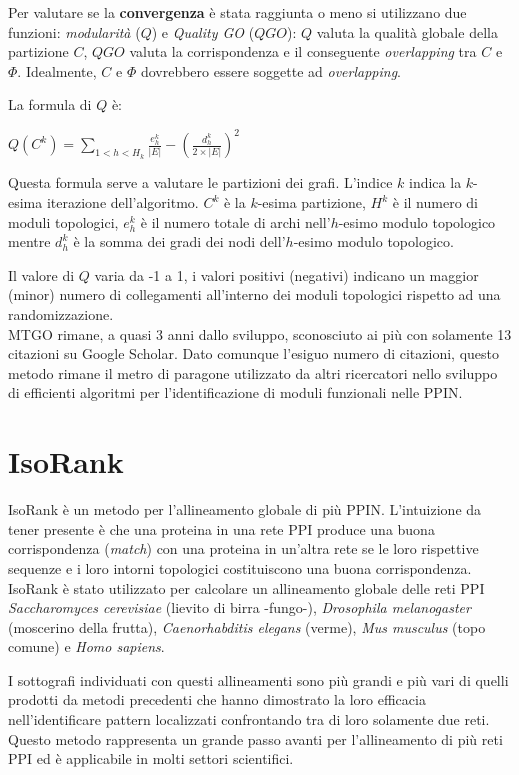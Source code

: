 \documentclass[11pt]{article}
\begin{document}
Per valutare se la \textbf{convergenza} è stata raggiunta o meno si utilizzano due funzioni: \textit{modularità} ($Q$) e \textit{Quality GO} ($QGO$): $Q$ valuta la qualità globale della partizione $C$, $QGO$ valuta la corrispondenza e il conseguente \textit{overlapping} tra $C$ e $\Phi$. Idealmente, $C$ e $\Phi$ dovrebbero essere soggette ad \textit{overlapping}.

La formula di $Q$ è:

\begin{center}
$Q(C^k) = \displaystyle{\sum_{1<h<H_k}\frac{e^k_h}{|E|} - \left(\frac{d^k_h}{2 \times |E|}\right)^2}$
\end{center}

Questa formula serve a valutare le partizioni dei grafi. L'indice $k$ indica la $k$-esima iterazione dell'algoritmo. $C^k$ è la $k$-esima partizione, $H^k$ è il numero di moduli topologici, $e^k_h$ è il numero totale di archi nell'$h$-esimo modulo topologico mentre $d^k_h$ è la somma dei gradi dei nodi dell'$h$-esimo modulo topologico. 

Il valore di $Q$ varia da -1 a 1, i valori positivi (negativi) indicano un maggior (minor) numero di collegamenti all'interno dei moduli topologici rispetto ad una randomizzazione.\\

MTGO rimane, a quasi 3 anni dallo sviluppo, sconosciuto ai più con solamente 13 citazioni su Google Scholar. Dato comunque l'esiguo numero di citazioni, questo metodo rimane il metro di paragone utilizzato da altri ricercatori nello sviluppo di efficienti algoritmi per l'identificazione di moduli funzionali nelle PPIN.

\pagebreak
\section{IsoRank}
IsoRank è un metodo per l'allineamento globale di più PPIN. L'intuizione da tener presente è che una proteina in una rete PPI produce una buona corrispondenza (\textit{match}) con una proteina in un'altra rete se le loro rispettive sequenze e i loro intorni topologici costituiscono una buona corrispondenza. IsoRank è stato utilizzato per calcolare un allineamento globale delle reti PPI \textit{Saccharomyces cerevisiae} (lievito di birra -fungo-), \textit{Drosophila melanogaster} (moscerino della frutta), \textit{Caenorhabditis elegans} (verme), \textit{Mus musculus} (topo comune) e \textit{Homo sapiens}.

I sottografi individuati con questi allineamenti sono più grandi e più vari di quelli prodotti da metodi precedenti che hanno dimostrato la loro efficacia nell'identificare pattern localizzati confrontando tra di loro solamente due reti. Questo metodo rappresenta un grande passo avanti per l'allineamento di più reti PPI ed è applicabile in molti settori scientifici.
\end{document}
